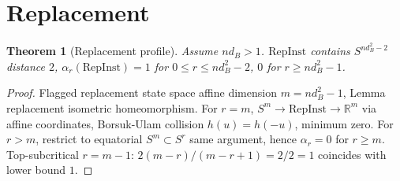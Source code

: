 \documentclass[11pt,a4paper]{article}
\newtheorem{theorem}{Theorem}[section]
\newcommand{\RepInst}{\mathrm{RepInst}}
\begin{document}
\section{Replacement}
\begin{theorem}[Replacement profile]
Assume $nd_B>1$. $\RepInst$ contains $S^{nd_B^2-2}$ distance $2$, $\alpha_r(\RepInst)=1$ for $0\le r\le nd_B^2-2$, $0$ for $r\ge nd_B^2-1$.
\end{theorem}
\begin{proof}
Flagged replacement state space affine dimension $m=nd_B^2-1$, Lemma replacement isometric homeomorphism.
For $r=m$, $S^m\to\RepInst\to\mathbb R^m$ via affine coordinates, Borsuk-Ulam collision $h(u)=h(-u)$, minimum zero.
For $r>m$, restrict to equatorial $S^m\subset S^r$ same argument, hence $\alpha_r=0$ for $r\ge m$.
Top-subcritical $r=m-1$: $2(m-r)/(m-r+1)=2/2=1$ coincides with lower bound $1$.
\end{proof}
\end{document}
